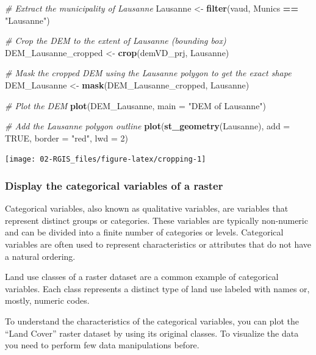 \documentclass[
]{article}
\newenvironment{Shaded}{\begin{snugshade}}{\end{snugshade}}
\newcommand{\AttributeTok}[1]{\textcolor[rgb]{0.13,0.29,0.53}{#1}}
\newcommand{\CommentTok}[1]{\textcolor[rgb]{0.56,0.35,0.01}{\textit{#1}}}
\newcommand{\ConstantTok}[1]{\textcolor[rgb]{0.56,0.35,0.01}{#1}}
\newcommand{\DecValTok}[1]{\textcolor[rgb]{0.00,0.00,0.81}{#1}}
\newcommand{\FunctionTok}[1]{\textcolor[rgb]{0.13,0.29,0.53}{\textbf{#1}}}
\newcommand{\NormalTok}[1]{#1}
\newcommand{\OtherTok}[1]{\textcolor[rgb]{0.56,0.35,0.01}{#1}}
\newcommand{\SpecialCharTok}[1]{\textcolor[rgb]{0.81,0.36,0.00}{\textbf{#1}}}
\newcommand{\StringTok}[1]{\textcolor[rgb]{0.31,0.60,0.02}{#1}}
\begin{document}
\begin{Shaded}
\begin{Highlighting}[]
\CommentTok{\# Extract the municipality of Lausanne}
\NormalTok{Lausanne }\OtherTok{\textless{}{-}} \FunctionTok{filter}\NormalTok{(vaud, Munics }\SpecialCharTok{==} \StringTok{"Lausanne"}\NormalTok{)}

\CommentTok{\# Crop the DEM to the extent of Lausanne (bounding box)}
\NormalTok{DEM\_Lausanne\_cropped }\OtherTok{\textless{}{-}} \FunctionTok{crop}\NormalTok{(demVD\_prj, Lausanne)}

\CommentTok{\# Mask the cropped DEM using the Lausanne polygon to get the exact shape}
\NormalTok{DEM\_Lausanne }\OtherTok{\textless{}{-}} \FunctionTok{mask}\NormalTok{(DEM\_Lausanne\_cropped, Lausanne)}

\CommentTok{\# Plot the DEM}
\FunctionTok{plot}\NormalTok{(DEM\_Lausanne, }\AttributeTok{main =} \StringTok{"DEM of Lausanne"}\NormalTok{)}

\CommentTok{\# Add the Lausanne polygon outline}
\FunctionTok{plot}\NormalTok{(}\FunctionTok{st\_geometry}\NormalTok{(Lausanne), }\AttributeTok{add =} \ConstantTok{TRUE}\NormalTok{, }\AttributeTok{border =} \StringTok{"red"}\NormalTok{, }\AttributeTok{lwd =} \DecValTok{2}\NormalTok{)}
\end{Highlighting}
\end{Shaded}

\begin{center}\texttt{[image: 02-RGIS\_files/figure-latex/cropping-1]} \end{center}

\subsubsection{Display the categorical variables of a raster}\label{display-the-categorical-variables-of-a-raster}

Categorical variables, also known as qualitative variables, are variables that represent distinct groups or categories. These variables are typically non-numeric and can be divided into a finite number of categories or levels. Categorical variables are often used to represent characteristics or attributes that do not have a natural ordering.

Land use classes of a raster dataset are a common example of categorical variables. Each class represents a distinct type of land use labeled with names or, mostly, numeric codes.

To understand the characteristics of the categorical variables, you can plot the ``Land Cover'' raster dataset by using its original classes. To visualize the data you need to perform few data manipulations before.
\end{document}

